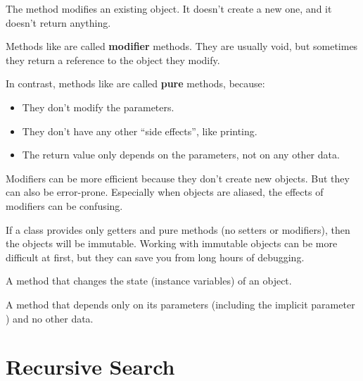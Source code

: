 The  method modifies an existing  object.
It doesn't create a new one, and it doesn't return anything.


Methods like  are called {\bf modifier} methods.
They are usually void, but sometimes they return a reference to the object they modify.


In contrast, methods like  are called {\bf pure} methods, because:

\begin{itemize}

\item They don't modify the parameters.

\item They don't have any other ``side effects'', like printing.

\item The return value only depends on the parameters, not on any other data.

\end{itemize}

Modifiers can be more efficient because they don't create new objects.
But they can also be error-prone.
Especially when objects are aliased, the effects of modifiers can be confusing.


If a class provides only getters and pure methods (no setters or modifiers), then the objects will be immutable.
Working with immutable objects can be more difficult at first, but they can save you from long hours of debugging.


\begin{description}

A method that changes the state (instance variables) of an object.

A method that depends only on its parameters (including the implicit parameter ) and no other data.

\end{description}


\section{Recursive Search}



